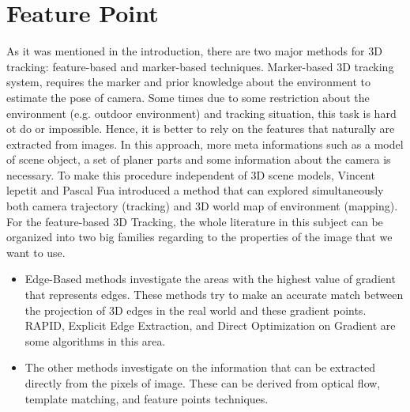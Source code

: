 \chapter{Feature Point}\label{chapter:Feature Point}
As it was mentioned in the introduction, there are two major methods for 3D tracking: feature-based and marker-based techniques. Marker-based 3D tracking system, requires the marker and prior knowledge about the environment to estimate the pose of camera. Some times due to some restriction about the environment (e.g. outdoor environment) and tracking situation, this task is hard ot do or impossible. Hence, it is better to rely on the features that naturally are extracted from images. In this approach, more meta informations such as a model of scene object, a set of planer parts and some information about the camera is necessary. To make this procedure independent of 3D scene models, Vincent lepetit and Pascal Fua \cite{lepetit2005monocular} introduced a method that can explored simultaneously both camera trajectory (tracking) and 3D world map of environment (mapping). \\
For the feature-based 3D Tracking, the whole literature in this subject can be organized into two big families regarding to the properties of the image that we want to use.
\begin{itemize}
\item Edge-Based methods investigate the areas with the highest value of gradient that represents edges. These methods try to make an accurate match between the projection of 3D edges in the real world and these gradient points. RAPID, Explicit Edge Extraction, and Direct Optimization on Gradient are some algorithms in this area. 
\item The other methods investigate on the information that can be extracted directly from the pixels of image. These can be derived from optical flow, template matching, and feature points techniques.
\end{itemize}


